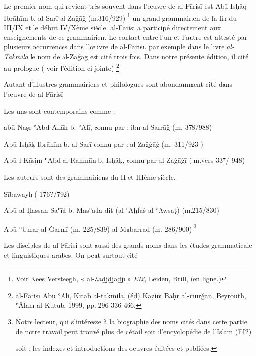 \documentclass[a4paper,12pt]{report}
\begin{document}
\begin{itemize}
Le premier nom qui revient très souvent dans l’œuvre de al-Fārisī est Abū Isḥāq Ibrāhīm b. al-Sarī al-Zaǧāǧ  (m.316/929) \footnote{Voir Kees Versteegh, « al-Zad̲j̲d̲j̲ād̲j̲ī » \textit{ EI2}, Leiden, Brill, (en ligne.)  } un grand grammairien de la fin du III/IX et le début IV/Xème siècle. al-Fārisī a participé directement aux enseignements de ce grammairien. Le contact entre l’un et l’autre est attesté par plusieurs occurrences dans l’œuvre de al-Fārisī. par exemple dans le livre \textit{al-Takmila}  le nom de al-Zaǧāg est cité trois fois. Dans notre présente édition, il cité au prologue ( voir l'édition ci-jointe)
\footnote{al-Fārisī Abū ʿAli, \underline {Kitāb al-takmila,} (éd) Kāẓim Baḥr al-murǧān, Beyrouth, ʿĀlam al-Kutub,  1999, pp. 296-336-466.}  

 \begin{Arabic}
\end{Arabic}

Autant d'illustres grammairiens et philologues sont abondamment  cité dans l'œuvre de al-Fārisī

Les uns sont contemporains comme : 
 
  abū Naṣr ʿAbd Allāh b. ʿAlī,  connu par :  ibn al-Sarrāǧ (m. 378/988)

   Abū Isḥāḳ Ibrāhīm b. al-Sarī connu par :  al-Zaǧǧāǧ (m. 311/923 )

 Abū l-Kāsim ʿAbd al-Raḥmān b. Isḥāḳ, connu par al-Zaǧāǧī ( m.vers 337/ 948)


Les auteurs sont des grammairiens du II et IIIème siècle.

 S\=ibawayh ( 176?/792)

 Abū al-Ḥassan  Saʿīd b. Masʿada   dit (al-ʾAḫfaš al-ʾAwsaṭ) (m.215/830)

 Abū ʿUmar al-Ǧarmī (m. 225/839) 
al-Mubarrad (m. 286/900)
\footnote{ Notre lecteur, qui s'intéresse à la biographie des noms cités dans cette partie de notre travail peut trouvé plus de détail 
soit :l'encyclopédie de l'Islam  (EI2)

soit : les indexes et introductions  des oeuvres éditées et publiées.  }


Les disciples  de al-Fārisi sont aussi des grands noms dans les études grammaticale et linguistiques arabes. On peut surtout cité


\end{itemize}
\end{document}

